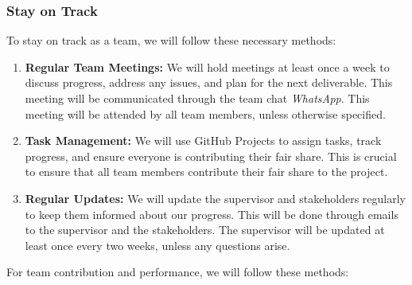 \documentclass{article}
\begin{document}
\subsubsection*{Stay on Track}

\iffalse
\wss{What methods will be used to keep the team on track? How will your team
ensure that members contribute as expected to the team and that the team
performs as expected? How will your team reward members who do well and manage
members whose performance is below expectations?  What are the consequences for
someone not contributing their fair share?}

\wss{You may wish to use the project management metrics collected for the TA and
instructor for this.}

\wss{You can set target metrics for attendance, commits, etc.  What are the
consequences if someone doesn't hit their targets?  Do they need to bring the
coffee to the next team meeting?  Does the team need to make an appointment with
their TA, or the instructor?  Are there incentives for reaching targets early?}
\fi

To stay on track as a team, we will follow these necessary methods:

\begin{enumerate}
  \item \textbf{Regular Team Meetings:} We will hold meetings at least once a week to discuss progress, address any issues, and plan for the next deliverable. This meeting will be communicated through the team chat \textit{WhatsApp}. This meeting will be attended by all team members, unless otherwise specified.
  \item \textbf{Task Management:} We will use GitHub Projects to assign tasks, track progress, and ensure everyone is contributing their fair share. This is crucial to ensure that all team members contribute their fair share to the project.
  \item \textbf{Regular Updates:} We will update the supervisor and stakeholders regularly to keep them informed about our progress. This will be done through emails to the supervisor and the stakeholders. The supervisor will be updated at least once every two weeks, unless any questions arise.
\end{enumerate}

For team contribution and performance, we will follow these methods:
\end{document}

